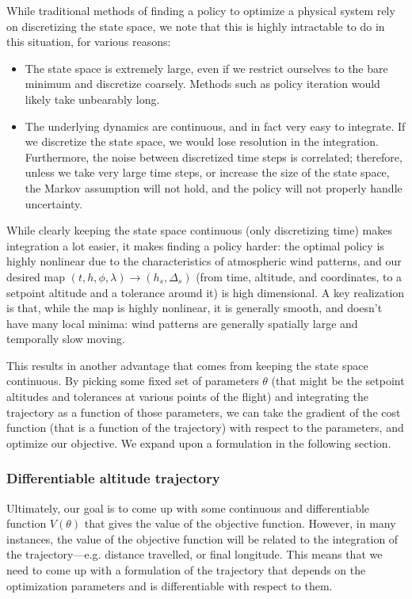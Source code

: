 \documentclass[11pt]{scrartcl} %
\begin{document}
While traditional methods of finding a policy to optimize a physical system rely on discretizing the state space, we note that this is highly intractable to do in this situation, for various reasons:
\begin{itemize}
\item The state space is extremely large, even if we restrict ourselves to the bare minimum and discretize coarsely. Methods such as policy iteration would likely take unbearably long.
\item The underlying dynamics are continuous, and in fact very easy to integrate. If we discretize the state space, we would lose resolution in the integration. Furthermore, the noise between discretized time steps is correlated; therefore, unless we take very large time steps, or increase the size of the state space, the Markov assumption will not hold, and the policy will not properly handle uncertainty.
\end{itemize}
While clearly keeping the state space continuous (only discretizing time) makes integration a lot easier, it makes finding a policy harder: the optimal policy is highly nonlinear due to the characteristics of atmospheric wind patterns, and our desired map $(t,h,\phi,\lambda)\to (h_s, \Delta_s)$ (from time, altitude, and coordinates, to a setpoint altitude and a tolerance around it) is high dimensional. A key realization is that, while the map is highly nonlinear, it is generally smooth, and doesn't have many local minima: wind patterns are generally spatially large and temporally slow moving.

This results in another advantage that comes from keeping the state space continuous. By picking some fixed set of parameters $\theta$ (that might be the setpoint altitudes and tolerances at various points of the flight) and integrating the trajectory as a function of those parameters, we can take the gradient of the cost function (that is a function of the trajectory) with respect to the parameters, and optimize our objective. We expand upon a formulation in the following section.

\subsubsection{Differentiable altitude trajectory}
Ultimately, our goal is to come up with some continuous and differentiable function $V(\theta)$ that gives the value of the objective function. However, in many instances, the value of the objective function will be related to the integration of the trajectory---e.g. distance travelled, or final longitude. This means that we need to come up with a formulation of the trajectory that depends on the optimization parameters and is differentiable with respect to them.
\end{document}
